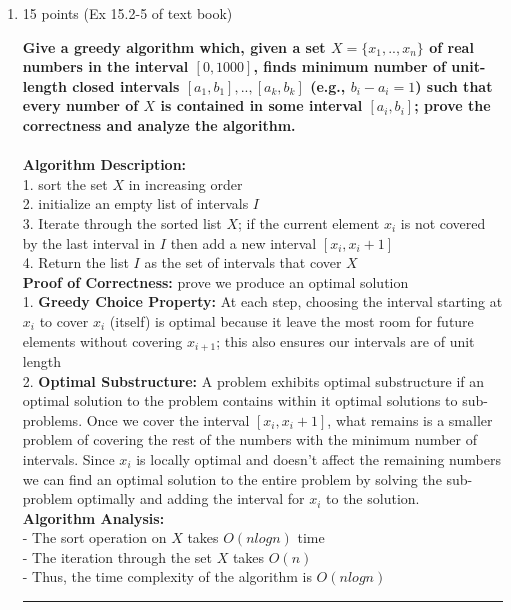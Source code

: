 \documentclass[letterpaper,12pt]{article}
\begin{document}
\begin{enumerate}
\noindent\rule{16cm}{0.1pt}

\item 15 points (Ex 15.2-5 of text book)

\textbf{Give a greedy algorithm which, given a set $X=\{x_1,..,x_n\}$ of real
numbers in the interval $[0,1000]$, finds minimum number of unit-length closed
intervals $[a_1,b_1],..,[a_k,b_k]$ (e.g., $b_i-a_i=1$) such that every number of
$X$ is contained in some interval $[a_i,b_i]$; prove the correctness and analyze
the algorithm.} \\ \\
\textbf{Algorithm Description:} \\
1. sort the set $X$ in increasing order \\
2. initialize an empty list of intervals $I$ \\
3. Iterate through the sorted list $X$; if the current element $x_i$ is not covered by the last interval in $I$ then add a new interval $[x_i, x_i + 1]$ \\
4. Return the list $I$ as the set of intervals that cover $X$ \\

\textbf{Proof of Correctness:} prove we produce an optimal solution \\
1. \textbf{Greedy Choice Property:} At each step, choosing the interval starting at $x_i$ to cover $x_i$ (itself) is optimal because it leave the most room for future elements without covering $x_{i+1}$; this also ensures our intervals are of unit length \\
2. \textbf{Optimal Substructure:} A problem exhibits optimal substructure if an optimal solution to the problem contains within it optimal solutions to sub-problems. Once we cover the interval $[x_i, x_i + 1]$, what remains is a smaller problem of covering the rest of the numbers with the minimum number of intervals. Since $x_i$ is locally optimal and doesn't affect the remaining numbers we can find an optimal solution to the entire problem by solving the sub-problem optimally and adding the interval for $x_i$ to the solution. \\

\textbf{Algorithm Analysis:} \\
- The sort operation on $X$ takes $O(nlogn)$ time \\
- The iteration through the set $X$ takes $O(n)$ \\
- Thus, the time complexity of the algorithm is $O(nlogn)$

\noindent\rule{16cm}{0.1pt}


\end{enumerate}
\end{document}

